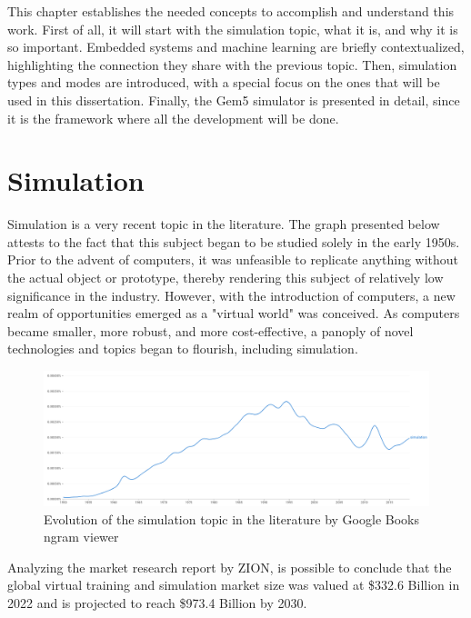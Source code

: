 
This chapter establishes the needed concepts to accomplish and understand this work. First of all, it will start with the simulation topic, what 
it is, and why it is so important. Embedded systems and machine learning are briefly contextualized, highlighting the connection they share with 
the previous topic. Then, simulation types and modes are introduced, with a special focus on the ones that will be used in this dissertation. 
Finally, the Gem5 simulator is presented in detail, since it is the framework where all the development will be done.


\section{Simulation}

Simulation is a very recent topic in the literature. The graph presented below attests to the fact that this subject began to be studied solely 
in the early 1950s. Prior to the advent of computers, it was unfeasible to replicate anything without the actual object or prototype, thereby 
rendering this subject of relatively low significance in the industry. However, with the introduction of computers, a new realm of opportunities 
emerged as a "virtual world" was conceived. As computers became smaller, more robust, and more cost-effective, a panoply of novel technologies 
and topics began to flourish, including simulation. 

\begin{figure}[H]
	\centering
 	\includegraphics[width=0.7\linewidth]{Images/simulation_evolution_graph.png}
 	\caption{Evolution of the simulation topic in the literature by Google Books ngram viewer}
	 \label{fig_simulation_evolution_graph}
\end{figure}

Analyzing the market research report by ZION, is possible to conclude that the global virtual training and simulation market size was valued 
at \$332.6 Billion in 2022 and is projected to reach \$973.4 Billion by 2030.  

